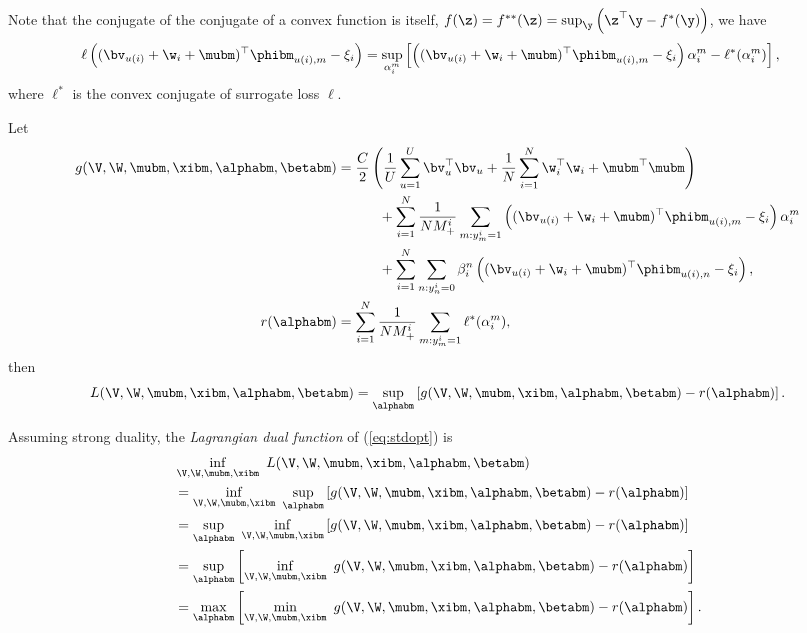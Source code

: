 Note that the conjugate of the conjugate of a convex function is itself, \ie $f(\z) = f^{**}(\z) = \sup_\y \left(\z^\top \y - f^*(\y) \right)$, we have
\begin{equation*}
\begin{aligned}
\ell \left( (\bv_{u(i)} + \w_i + \mubm)^\top \phibm_{u(i),m} - \xi_i \right)
&= \sup_{\alpha_i^m} \left[ \left( (\bv_{u(i)} + \w_i + \mubm)^\top \phibm_{u(i),m} - \xi_i \right) \alpha_i^m - \ell^*(\alpha_i^m) \right],
\end{aligned}
\end{equation*}
where $\ell^*$ is the convex conjugate of surrogate loss $\ell$.

Let
\begin{equation*}
\begin{aligned}
g(\V, \W, \mubm, \xibm, \alphabm, \betabm)
&= \frac{C}{2} \left( \frac{1}{U} \sum_{u=1}^U \bv_u^\top \bv_u 
     + \frac{1}{N} \sum_{i=1}^N \w_i^\top \w_i + \mubm^\top \mubm \right) \\
& \hspace{3em}
     + \sum_{i=1}^N \frac{1}{N M_+^i} \sum_{m: y_m^i = 1} \left( (\bv_{u(i)} + \w_i + \mubm)^\top \phibm_{u(i),m} - \xi_i \right) \alpha_i^m \\
& \hspace{3em}
     + \sum_{i=1}^N \sum_{n: y_n^i = 0} \beta_i^n \left( (\bv_{u(i)} + \w_i + \mubm)^\top \phibm_{u(i),n} - \xi_i \right), \\
r(\alphabm)
&= \sum_{i=1}^N \frac{1}{N M_+^i} \sum_{m: y_m^i = 1} \ell^*(\alpha_i^m),
\end{aligned}
\end{equation*}
then 
\begin{equation*}
\begin{aligned}
L(\V, \W, \mubm, \xibm, \alphabm, \betabm) 
= \sup_\alphabm \left[ g(\V, \W, \mubm, \xibm, \alphabm, \betabm) - r(\alphabm) \right].
\end{aligned}
\end{equation*}

Assuming strong duality, the \emph{Lagrangian dual function} of (\ref{eq:stdopt}) is
\begin{equation}
\label{eq:dualfunc}
\begin{aligned}
&\inf_{\V, \W, \mubm, \xibm} \ L(\V, \W, \mubm, \xibm, \alphabm, \betabm) \\
&= \inf_{\V, \W, \mubm, \xibm} \ \sup_\alphabm \left[ g(\V, \W, \mubm, \xibm, \alphabm, \betabm) - r(\alphabm) \right] \\
&= \sup_\alphabm \ \inf_{\V, \W, \mubm, \xibm} \left[ g(\V, \W, \mubm, \xibm, \alphabm, \betabm) - r(\alphabm) \right] \\
&= \sup_\alphabm \left[ \inf_{\V, \W, \mubm, \xibm} \ g(\V, \W, \mubm, \xibm, \alphabm, \betabm) - r(\alphabm) \right] \\
&= \max_\alphabm \left[ \min_{\V, \W, \mubm, \xibm} \ g(\V, \W, \mubm, \xibm, \alphabm, \betabm) - r(\alphabm) \right].
\end{aligned}
\end{equation}

